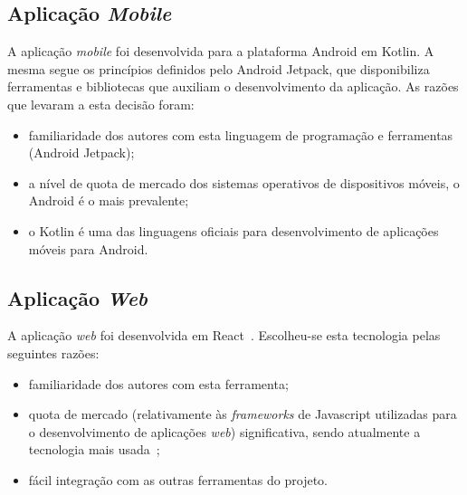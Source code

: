\subsection{Aplicação \textit{Mobile}}
A aplicação \textit{mobile} foi desenvolvida para a plataforma Android em Kotlin. A mesma segue os princípios definidos pelo Android Jetpack, que disponibiliza ferramentas e bibliotecas que auxiliam o desenvolvimento da aplicação. As razões que levaram a esta decisão foram:
\begin{itemize}
	\item familiaridade dos autores com esta linguagem de programação e ferramentas (Android Jetpack);
	\item a nível de quota de mercado dos sistemas operativos de dispositivos móveis, o Android é o mais prevalente;
	\item o Kotlin é uma das linguagens oficiais para desenvolvimento de aplicações móveis para Android.
\end{itemize}

\subsection{Aplicação \textit{Web}}
A aplicação \textit{web} foi desenvolvida em React~\cite{angular_vs_react}. Escolheu-se esta tecnologia pelas seguintes razões:

\begin{itemize}
	\item familiaridade dos autores com esta ferramenta;
	\item quota de mercado (relativamente às \textit{frameworks} de Javascript utilizadas para o desenvolvimento de aplicações \textit{web}) significativa, sendo atualmente a tecnologia mais usada~\cite{angular_vs_react};
	\item fácil integração com as outras ferramentas do projeto.
\end{itemize}

